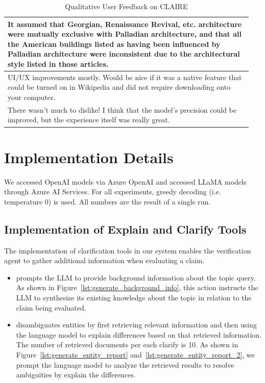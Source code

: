 \documentclass[11pt]{article}
\newcommand{\system}[0]{\textsc{CLAIRE}\xspace}
\newcommand{\action}[1]{%
\tcbox[colback=actionblue!20,colframe=actionblue!50!black,boxrule=0.3pt,arc=2pt,
top=-3.5pt,bottom=-3.5pt,left=0.5pt,right=0.5pt,
nobeforeafter,tcbox raise base]{\texttt{\strut #1}}%
}
\begin{document}
\begin{table}[htbp]
\begin{tabular}{p{0.95\linewidth}}
\midrule
It assumed that Georgian, Renaissance Revival, etc. architecture were mutually exclusive with Palladian architecture, and that all the American buildings listed as having been influenced by Palladian architecture were inconsistent due to the architectural style listed in those articles. \\
\midrule
UI/UX improvements mostly. Would be nice if it was a native feature that could be turned on in Wikipedia and did not require downloading onto your computer. \\
\midrule
There wasn't much to dislike! I think that the model's precision could be improved, but the experience itself was really great. \\
\bottomrule
\end{tabular}
\caption{Qualitative User Feedback on \system}
\label{tab:user_feedback}
\end{table}






\section{Implementation Details}
\label{sec:system_implementations}
We accessed OpenAI models via Azure OpenAI and accessed LLaMA models through Azure AI Services. For all experiments, greedy decoding (i.e. temperature 0) is used.
All numbers are the result of a single run.

\subsection{Implementation of Explain and Clarify Tools}
\label{sec:tools_implementation}

The implementation of clarification tools in our system enables the verification agent to gather additional information when evaluating a claim. 

\begin{itemize}
    \item \action{explain} prompts the LLM to provide background information about the topic query. As shown in Figure~\ref{lst:generate_background_info}, this action instructs the LLM to synthesize its existing knowledge about the topic in relation to the claim being evaluated.
    \item \action{clarify} disambiguates entities by first retrieving relevant information and then using the language model to explain differences based on that retrieved information. The number of retrieved documents per each clarify is 10. As shown in Figure~\ref{lst:generate_entity_report} and~\ref{lst:generate_entity_report_2}, we prompt the language model to analyze the retrieved results to resolve ambiguities by explain the differences.
\end{itemize}
\end{document}
